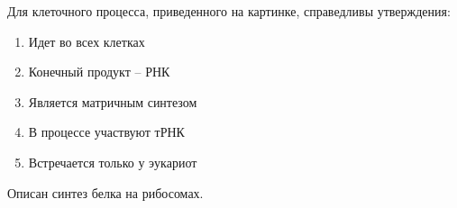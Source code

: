 
Для клеточного процесса,
приведенного на картинке, справедливы утверждения:


\begin{enumerate}
    \item Идет во всех клетках
    \item Конечный продукт – РНК
    \item Является матричным синтезом
    \item В процессе участвуют тРНК
    \item Встречается только у эукариот
\end{enumerate}

\explanationSection

Описан синтез белка на рибосомах.

